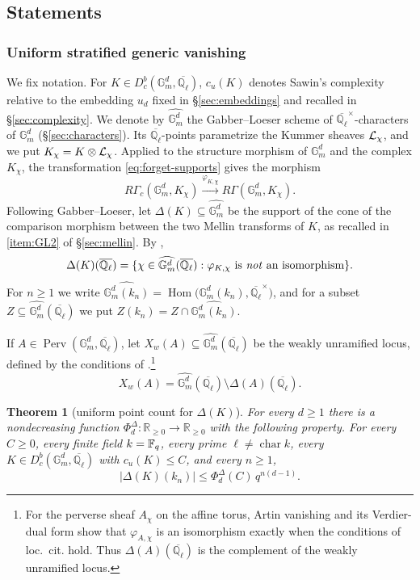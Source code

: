 \documentclass[12pt,reqno]{amsart}
\theoremstyle{definition}
\theoremstyle{plain}
\newtheorem{thm}[para]{Theorem}
\theoremstyle{definition}
\theoremstyle{remark}
\newcommand{\bbG}{\mathbb{G}}  \newcommand{\bbH}{\mathbb{H}}
\newcommand{\bbQ}{\mathbb{Q}}  \newcommand{\bbR}{\mathbb{R}}
\newcommand{\ol}[1]{\overline{#1}}
\newcommand{\Ql}{\bbQ_{\ell}}
\newcommand{\Db}{D^b_c}
\newcommand{\Gm}{\bbG_m}
\newcommand{\Perv}{\operatorname{Perv}}
\newcommand{\cu}{c_u}
\begin{document}
\subsection{Statements}
\label{sec:statements}

\subsubsection{Uniform stratified generic vanishing}

We fix notation.  For \(K\in\Db(\Gm^d,\ol\Ql)\), \(\cu(K)\) denotes Sawin's complexity
relative to the embedding \(u_d\) fixed in \S\ref{sec:embeddings} and recalled in
\S\ref{sec:complexity}.  We denote by \(\widehat{\Gm^d}\) the Gabber--Loeser scheme of
\(\ol\Ql^{\times}\)-characters of \(\Gm^d\) (\S\ref{sec:characters}).  Its
\(\ol\Ql\)-points parametrize the Kummer sheaves \(\mathcal{L}_\chi\), and we put \(K_\chi=K\otimes\mathcal{L}_\chi\).
Applied to the structure morphism of \(\Gm^d\) and the complex \(K_\chi\), the transformation
\eqref{eq:forget-supports} gives the morphism
\[
        R\Gamma_c(\Gm^d,K_\chi)
        \xrightarrow{\varphi_{K,\chi}}
        R\Gamma(\Gm^d,K_\chi).
\]
Following Gabber--Loeser, let \(\Delta(K)\subseteq\widehat{\Gm^d}\) be the support of the cone of the
comparison morphism between the two Mellin transforms of \(K\), as recalled in \ref{item:GL2} of
\S\ref{sec:mellin}.  By \cite[Prop.~3.3.4(i)]{GabberLoeser1996},
\[
        \Delta(K)(\ol\Ql)
        =\{\chi\in\widehat{\Gm^d}(\ol\Ql):\varphi_{K,\chi}\text{ is \emph{not} an isomorphism}\}.
\]
For \(n\ge1\) we write
\(\widehat{\Gm^d(k_n)}=\operatorname{Hom}\bigl(\Gm^d(k_n),\ol\Ql^{\times}\bigr)\), and for a subset
\(Z\subseteq\widehat{\Gm^d}(\ol\Ql)\) we put \(Z(k_n)=Z\cap\widehat{\Gm^d(k_n)}\).

If \(A\in\Perv(\Gm^d,\ol\Ql)\), let \(X_w(A)\subseteq\widehat{\Gm^d}(\ol\Ql)\) be the weakly unramified
locus, defined by the conditions of \cite[Def.~3.1]{ForeyFresanKowalski2021}.\footnote{For the perverse sheaf \(A_\chi\) on the
affine torus, Artin vanishing and its Verdier-dual form \cite[Th.~4.1.1, Cor.~4.1.2]{BBDG18} show that
\(\varphi_{A,\chi}\) is an isomorphism exactly when the conditions of loc.~cit. hold.  Thus
\(\Delta(A)(\ol\Ql)\) is the complement of the weakly unramified locus.}
\begin{equation}
\label{eq:weak-locus}
 X_w(A)=\widehat{\Gm^d}(\ol\Ql)\setminus\Delta(A)(\ol\Ql).
\end{equation}

\begin{thm}[uniform point count for \(\Delta(K)\)]
\label{thm:delta-count}
For every \(d\ge1\) there is a nondecreasing function
\(\Phi^\Delta_{d}:\mathbb R_{\ge0}\to\mathbb R_{\ge0}\) with the following property.  For every
\(C\ge0\), every finite field \(k=\mathbb{F}_q\), every prime \(\ell\neq\operatorname{char}k\), every
\(K\in\Db(\Gm^d,\ol\Ql)\) with \(\cu(K)\le C\), and every \(n\ge1\),
\[
        |\Delta(K)(k_n)|\le \Phi^\Delta_{d}(C)\,q^{n(d-1)} .
\]
\end{thm}
\end{document}
